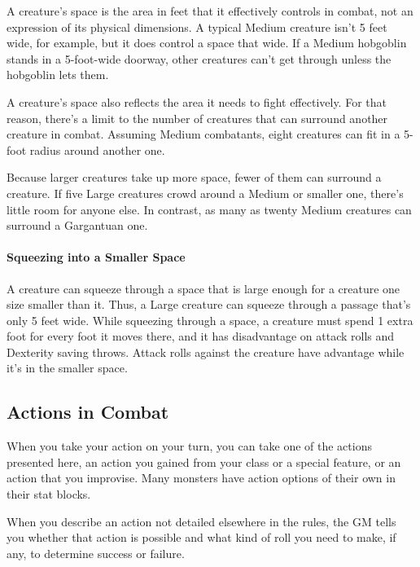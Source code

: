 \documentclass[
]{article}
\begin{document}
A creature's space is the area in feet that it effectively controls in
combat, not an expression of its physical dimensions. A typical Medium
creature isn't 5 feet wide, for example, but it does control a space
that wide. If a Medium hobgoblin stands in a 5-foot-wide doorway, other
creatures can't get through unless the hobgoblin lets them.

A creature's space also reflects the area it needs to fight effectively.
For that reason, there's a limit to the number of creatures that can
surround another creature in combat. Assuming Medium combatants, eight
creatures can fit in a 5-foot radius around another one.

Because larger creatures take up more space, fewer of them can surround
a creature. If five Large creatures crowd around a Medium or smaller
one, there's little room for anyone else. In contrast, as many as twenty
Medium creatures can surround a Gargantuan one.

\hypertarget{squeezing-into-a-smaller-space}{%
\paragraph{Squeezing into a Smaller
Space}\label{squeezing-into-a-smaller-space}}

A creature can squeeze through a space that is large enough for a
creature one size smaller than it. Thus, a Large creature can squeeze
through a passage that's only 5 feet wide. While squeezing through a
space, a creature must spend 1 extra foot for every foot it moves there,
and it has disadvantage on attack rolls and Dexterity saving throws.
Attack rolls against the creature have advantage while it's in the
smaller space.

\hypertarget{actions-in-combat}{%
\subsection{Actions in Combat}\label{actions-in-combat}}

When you take your action on your turn, you can take one of the actions
presented here, an action you gained from your class or a special
feature, or an action that you improvise. Many monsters have action
options of their own in their stat blocks.

When you describe an action not detailed elsewhere in the rules, the GM
tells you whether that action is possible and what kind of roll you need
to make, if any, to determine success or failure.
\end{document}
